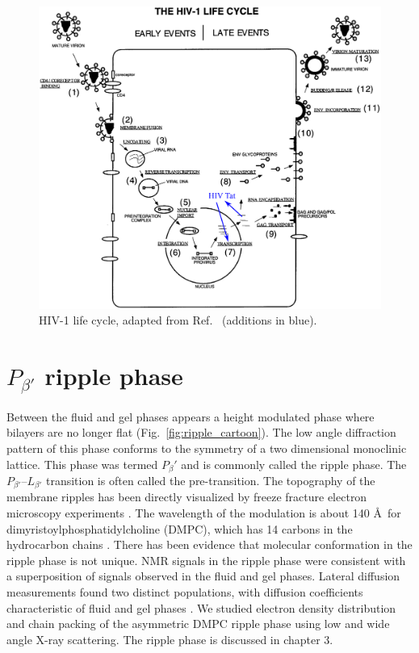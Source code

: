 \begin{figure}
  \centering
  \includegraphics[width=\textwidth]{figures/HIV_lifecycle}
  \caption{HIV-1 life cycle, adapted from Ref.~\cite{Freed98}
  (additions in blue).}
  \label{fig:HIV_lifecycle}
\end{figure}

\section{$P_{\beta'}$ ripple phase}
Between the fluid and gel phases appears a height modulated phase where
bilayers are no longer flat (Fig.~\ref{fig:ripple_cartoon}). 
The low angle diffraction pattern of this phase conforms to the symmetry
of a two dimensional monoclinic lattice. This phase was termed $P_\beta'$ 
and is commonly
called the ripple phase. The $P_{\beta'}$--$L_{\beta'}$ transition is often
called the pre-transition.
The topography of the membrane ripples has been directly
visualized by freeze fracture electron microscopy experiments 
\cite{ref:Luna77,ref:Copeland80,ref:Ruppel83,ref:Zasadzinski87,ref:Zasadzinski88}.
The wavelength of the modulation is about 140 \AA\ for 
dimyristoylphosphatidylcholine (DMPC),
which has 14 carbons in the hydrocarbon chains \cite{ref:Wack89}.
There has been evidence that molecular conformation in the ripple phase is not 
unique. NMR signals in the ripple phase \cite{ref:Wittebort81} were consistent
with a superposition of signals observed in the fluid and gel phases.
Lateral diffusion measurements found two distinct populations,
with diffusion coefficients characteristic of fluid and gel phases
\cite{ref:Schneider83}. 
We studied electron density distribution and chain packing 
of the asymmetric DMPC ripple phase using low and wide angle X-ray scattering.
The ripple phase is discussed in chapter 3. 

